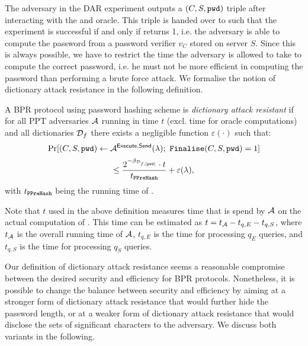 \noindent
The adversary in the DAR experiment outputs a $(C,S,\mathtt{pwd})$ triple after interacting with the \Execute and \Send oracle.
This triple is handed over to \Finalise such that the experiment is successful if and only if \Finalise returns 1, i.e. the adversary is able to compute the password \pwd from a password verifier $v_C$ stored on server $S$.
Since this is always possible, we have to restrict the time the adversary is allowed to take to compute the correct password, i.e. he must not be more efficient in computing the password than performing a brute force attack.
We formalise the notion of dictionary attack resistance in the following definition.

\begin{definition}\label{def:dar}
A BPR protocol using password hashing scheme \Hash is \emph{dictionary attack resistant} if for all PPT adversaries $\mathcal{A}$ running in time $t$ (excl. time for oracle computations) and all dictionaries $\mathcal{D}_f$ there exists a negligible function $\varepsilon(\cdot)$ such that:
\[\Pr[(C,S,\mathtt{pwd})\gets\mathcal{A}^{\mathsf{Execute}, \mathsf{Send}}(\lambda);~ \mathtt{Finalise}(C,S,\mathtt{pwd})=1] \]
\[\leq \frac{2^{-\beta_{\mathcal{D}_{f,|\mathtt{pwd}|}}}\cdot t}{t_{\mathtt{PPreHash}}} + \varepsilon(\lambda),\]
with $t_\mathtt{PPreHash}$ being the running time of \PPreHash.
\eod
\end{definition}

\noindent
Note that $t$ used in the above definition measures time that is spend by $\mathcal{A}$ on the actual computation of \pwd. This time can be estimated as $t=t_\mathcal{A}-t_{q,E}-t_{q,S}$, where  $t_\mathcal{A}$ is the overall running time of $\mathcal{A}$, $t_{q,E}$ is the time for processing $q_E$ \Execute queries, and $t_{q,S}$ is the time for processing $q_S$ \Send queries. 


Our definition of dictionary attack resistance seems a reasonable compromise between the desired security and efficiency for BPR protocols.
Nonetheless, it is possible to change the balance between security and efficiency by aiming at a stronger form of dictionary attack resistance that would further hide the password length, or at a weaker form of dictionary attack resistance that would disclose the sets of significant characters to the adversary. We discuss both variants in the following.

